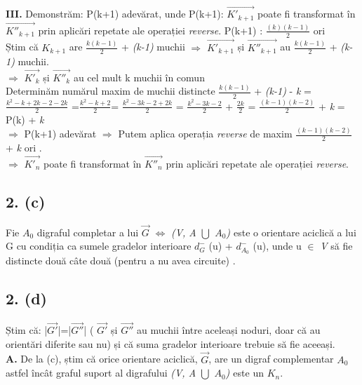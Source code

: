 \documentclass[12pt] {fphw}
\begin{document}
\begin{flushleft}
\textbf{III.}  Demonstrăm: P(k+1) adevărat, unde P(k+1): {$\vec{K'_{k+1}}$} poate fi transformat în  {$\vec{K''_{k+1}}$} prin aplicări repetate ale operației \textit{reverse}. P(k+1) : $\frac{(k)(k-1)}{2}$ ori \\

Știm că {$K_{k+1}$} are $\frac{k(k-1)}{2}$ + \textit{(k-1)} muchii  $\Longrightarrow$
{$\vec{K'_{k+1}}$} și {$\vec{K''_{k+1}}$} au $\frac{k(k-1)}{2}$ + \textit{(k-1)} muchii.  \\
$\Longrightarrow$ {$\vec{K'_k}$} și {$\vec{K''_k}$} au cel mult k muchii în comun \\
Determinăm numărul maxim de muchii distincte
$\frac{k(k-1)}{2}$ + \textit{(k-1)} - \textit{k} = $\frac{k^2-k+2k-2-2k}{2}$ =$\frac{k^2-k+2}{2}$= $\frac{k^2-3k-2+2k}{2}$ =  $\frac{k^2-3k-2}{2}$ + $\frac{2k}{2}$ = $\frac{(k-1)(k-2)}{2}$ + \textit{k} = P(k) + \textit{k} \\
$\Longrightarrow$ P(k+1) adevărat
$\Longrightarrow$ Putem aplica operația \textit{reverse} de maxim $\frac{(k-1)(k-2)}{2}$ + \textit{k} ori .  \\

$\Longrightarrow$ {$\vec{K'_n}$} poate fi transformat în {$\vec{K''_n}$} prin aplicări repetate ale operației  \textit{reverse}. 

\end {flushleft}
\subsection*{2. (c)}
Fie {$A_0$} digraful completar a lui {$\vec{G}$} $\Longleftrightarrow$ \textit{(V, A  $\bigcup$ {$A_0$) }} este o orientare aciclică a lui G cu condiția ca sumele gradelor interioare {$d_{G}^-$} (u) + {$d_{A_0}^-$} (u), unde u $\in$ \textit{V} să fie distincte două câte două (pentru a nu avea circuite) . 

\subsection*{2. (d)}
Știm că: |{$\vec{G'}$}|=|{$\vec{G''}$}| ( {$\vec{G'}$} și {$\vec{G''}$} au muchii între aceleași noduri, doar că au orientări diferite sau nu) și că suma gradelor interioare trebuie să fie aceeași. \\

\textbf{A.} De la (c), știm că orice orientare aciclică, {$\vec{G}$}, are un digraf complementar {$A_0$} astfel încât graful suport al digrafului \textit{(V, A  $\bigcup$ {$A_0$) }} este un {${K_n}$}. \\
\end{document}
